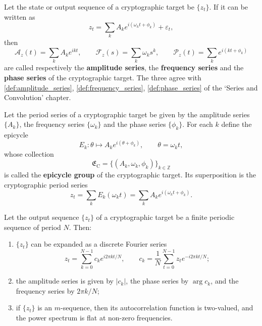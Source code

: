 \begin{definition}\label{def:crypto_series}
Let the state or output sequence of a cryptographic target be \(\{z_t\}\). If it can be written as
\[
z_t=\sum_k A_k e^{i(\omega_k t+\phi_k)}+\varepsilon_t,
\]
then
\[
\mathcal A_z(t)=\sum_k A_k e^{ikt},\qquad
\mathcal F_z(s)=\sum_k \omega_k s^k,\qquad
\mathcal P_z(t)=\sum_k e^{i(kt+\phi_k)}
\]
are called respectively the \textbf{amplitude series}, the \textbf{frequency series} and the \textbf{phase series} of the cryptographic target. The three agree with \cref{def:amplitude_series}, \cref{def:frequency_series}, \cref{def:phase_series} of the `Series and Convolution' chapter.
\end{definition}

\begin{definition}\label{def:crypto_epicycle_group}
Let the period series of a cryptographic target be given by the amplitude series \(\{A_k\}\), the frequency series \(\{\omega_k\}\) and the phase series \(\{\phi_k\}\). For each \(k\) define the epicycle
\[
E_k:\theta\mapsto A_k e^{i(\theta+\phi_k)},\qquad \theta=\omega_k t,
\]
whose collection
\[
\mathfrak E_{\mathrm{C}}=\{(A_k,\omega_k,\phi_k)\}_{k\in\mathbb Z}
\]
is called the \textbf{epicycle group} of the cryptographic target. Its superposition is the cryptographic period series
\[
z_t=\sum_k E_k(\omega_k t)=\sum_k A_k e^{i(\omega_k t+\phi_k)}.
\]
\end{definition}

\begin{theorem}\label{thm:crypto_series_reconstruction}
Let the output sequence \(\{z_t\}\) of a cryptographic target be a finite periodic sequence of period \(N\). Then:
\begin{enumerate}[label=(\roman*)]
    \item \(\{z_t\}\) can be expanded as a discrete Fourier series
    \[
    z_t=\sum_{k=0}^{N-1}c_k e^{i2\pi kt/N},\qquad
    c_k=\frac1N\sum_{t=0}^{N-1}z_t e^{-i2\pi kt/N};
    \]
    \item the amplitude series is given by \(|c_k|\), the phase series by \(\arg c_k\), and the frequency series by \(2\pi k/N\);
    \item if \(\{z_t\}\) is an \(m\)-sequence, then its autocorrelation function is two-valued, and the power spectrum is flat at non-zero frequencies.
\end{enumerate}
\end{theorem}

